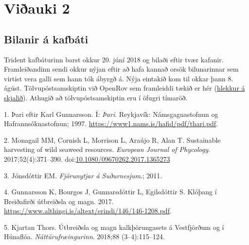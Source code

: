 \documentclass[icelandic,]{book}
\begin{document}
\hypertarget{v2}{%
\chapter{Viðauki 2}\label{v2}}

\hypertarget{bilanir-a-kafbati}{%
\section{Bilanir á kafbáti}\label{bilanir-a-kafbati}}

Trident kafbáturinn barst okkur 20. júní 2018 og bilaði eftir tvær kafanir. Framleiðandinn sendi okkur nýjan eftir að hafa kannað orsök bilunarinnar sem virtist vera galli sem hann tók ábyrgð á. Nýja eintakið kom til okkar þann 8. ágúst. Tölvupóstsamskiptin við OpenRov sem framleiddi tækið er hér (\href{https://github.com/harkanatta/ssnv_trident/blob/master/skjol/bilanir.pdf}{hlekkur á skjalið}). Athugið að tölvupóstsamskiptin eru í öfugri tímaröð.

\hypertarget{refs}{}
\leavevmode\hypertarget{ref-karl1997}{}%
1. Þari eftir Karl Gunnarsson. Í: \emph{Þari}. Reykjavík: Námsgagnastofnun og Hafrannsóknastofnun; 1997. \url{https://www1.nams.is/hafid/pdf/thari.pdf}.

\leavevmode\hypertarget{ref-Monagail2017}{}%
2. Monagail MM, Cornish L, Morrison L, Araújo R, Alan T. Sustainable harvesting of wild seaweed resources. \emph{European Journal of Phycology}. 2017;52(4):371--390. doi:\href{https://doi.org/10.1080/09670262.2017.1365273}{10.1080/09670262.2017.1365273}

\leavevmode\hypertarget{ref-Jonsdottir2011}{}%
3. Jónsdóttir EM. \emph{Fjörunytjar á Suðurnesjum}.; 2011.

\leavevmode\hypertarget{ref-Gunnarsson2017}{}%
4. Gunnarsson K, Bourgos J, Gunnarsdóttir L, Egilsdóttir S. Klóþang í Breiðafirði útbreiðsla og magn. 2017. \url{https://www.althingi.is/altext/erindi/146/146-1208.pdf}.

\leavevmode\hypertarget{ref-thors}{}%
5. Kjartan Thors. Útbreiðsla og magn kalkþörungasets á Vestfjörðum og í Húnaflóa. \emph{Náttúrufræingurinn}. 2018;88 (3--4):115--124.
\end{document}
